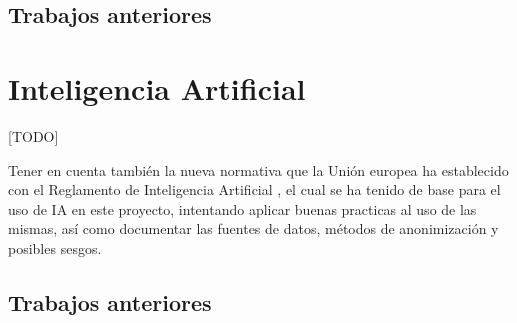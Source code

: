 	\subsection{Trabajos anteriores}


\section{Inteligencia Artificial}

[TODO]

Tener en cuenta también la nueva normativa que la Unión europea ha establecido con el Reglamento de Inteligencia Artificial \citep{webRIA2024Europa}, el cual se ha tenido de base para el uso de IA en este proyecto, intentando aplicar buenas practicas al uso de las mismas, así como documentar las fuentes de datos, métodos de anonimización y posibles sesgos.
	
	\subsection{Trabajos anteriores}


